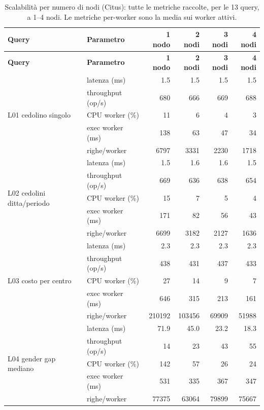 \begingroup
\footnotesize
\begin{longtable}{@{}llrrrr@{}}
\caption{Scalabilità per numero di nodi (Citus): tutte le metriche raccolte, per le 13 query, a 1--4 nodi. Le metriche per-worker sono la media sui worker attivi.}\label{tab:scaling-nodi-full}\\
\toprule \textbf{Query} & \textbf{Parametro} & \textbf{1 nodo} & \textbf{2 nodi} & \textbf{3 nodi} & \textbf{4 nodi} \\ \midrule \endfirsthead
\toprule \textbf{Query} & \textbf{Parametro} & \textbf{1 nodo} & \textbf{2 nodi} & \textbf{3 nodi} & \textbf{4 nodi} \\ \midrule \endhead
\multirow{5}{*}{L01 cedolino singolo} & latenza (ms)     & 1.5 & 1.5 & 1.5 & 1.5 \\
 & throughput (op/s) & 680 & 666 & 669 & 688 \\
 & CPU worker (\%)   & 11 & 6 & 4 & 3 \\
 & exec worker (ms)  & 138 & 63 & 47 & 34 \\
 & righe/worker      & 6797 & 3331 & 2230 & 1718 \\ \midrule
\multirow{5}{*}{L02 cedolini ditta/periodo} & latenza (ms)     & 1.5 & 1.6 & 1.6 & 1.5 \\
 & throughput (op/s) & 669 & 636 & 638 & 654 \\
 & CPU worker (\%)   & 15 & 7 & 5 & 4 \\
 & exec worker (ms)  & 171 & 82 & 56 & 43 \\
 & righe/worker      & 6699 & 3182 & 2127 & 1636 \\ \midrule
\multirow{5}{*}{L03 costo per centro} & latenza (ms)     & 2.3 & 2.3 & 2.3 & 2.3 \\
 & throughput (op/s) & 438 & 431 & 437 & 433 \\
 & CPU worker (\%)   & 27 & 14 & 9 & 7 \\
 & exec worker (ms)  & 646 & 315 & 213 & 161 \\
 & righe/worker      & 210192 & 103456 & 69909 & 51988 \\ \midrule
\multirow{5}{*}{L04 gender gap mediano} & latenza (ms)     & 71.9 & 45.0 & 23.2 & 18.3 \\
 & throughput (op/s) & 14 & 23 & 43 & 55 \\
 & CPU worker (\%)   & 142 & 57 & 26 & 24 \\
 & exec worker (ms)  & 531 & 335 & 367 & 347 \\
 & righe/worker      & 77375 & 63064 & 79899 & 75667 \\ \midrule

\end{longtable}
